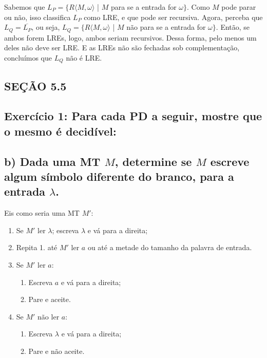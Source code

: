 Sabemos que $L_P = \{R\langle M,\omega \rangle $ | $M$ para se a entrada for $\omega \}$. Como $M$ pode parar ou não, isso classifica $L_P$ como LRE, e que pode ser recursiva. Agora, perceba que $L_Q = \overline{L_P}$, ou seja, $L_Q = \{R\langle M,\omega \rangle $ | $M$ não para se a entrada for $\omega \}$. Então, se ambos forem LREs, logo, ambos seriam recursivos. Dessa forma, pelo menos um deles não deve ser LRE. E as LREs não são fechadas sob complementação, concluímos que $L_Q$ não é LRE.




\subsection*{SEÇÃO 5.5}
\subsection*{Exercício 1: Para cada PD a seguir, mostre que o mesmo é decidível:}

\subsection*{b) Dada uma MT $M$, determine se $M$ escreve algum símbolo diferente do branco, para a entrada $\lambda$.}

Eis como seria uma MT $M'$:

\begin{enumerate}
    \item Se $M'$ ler $\lambda$; escreva $\lambda$ e vá para a direita;
    \item Repita 1. até $M'$ ler $a$ ou até a metade do tamanho da palavra de entrada.
    \item Se $M'$ ler $a$:
    
    \begin{enumerate}
        \item Escreva $a$ e vá para a direita;
        \item Pare e aceite.
    \end{enumerate}
    
    \item Se $M'$ não ler $a$:
    
    \begin{enumerate}
        \item Escreva $\lambda$ e vá para a direita;
        \item Pare e não aceite.
    \end{enumerate}
\end{enumerate}

